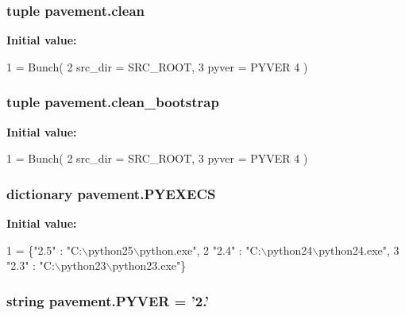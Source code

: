 \subsubsection[{clean}]{\setlength{\rightskip}{0pt plus 5cm}tuple pavement.\+clean}\label{namespacepavement_a522eb2426d7492ec5e58f9d33c57383b}
{\bfseries Initial value\+:}
\begin{DoxyCode}
1 = Bunch(
2         src\_dir = SRC\_ROOT,
3         pyver = PYVER
4     )
\end{DoxyCode}
\hypertarget{namespacepavement_a8e1619326965293da2fa40f456fae450}{}
\subsubsection[{clean\+\_\+bootstrap}]{\setlength{\rightskip}{0pt plus 5cm}tuple pavement.\+clean\+\_\+bootstrap}\label{namespacepavement_a8e1619326965293da2fa40f456fae450}
{\bfseries Initial value\+:}
\begin{DoxyCode}
1 = Bunch(
2         src\_dir = SRC\_ROOT,
3         pyver = PYVER
4     )
\end{DoxyCode}
\hypertarget{namespacepavement_a82d9e979fa2f57253e3bf6c59af5c791}{}
\subsubsection[{P\+Y\+E\+X\+E\+C\+S}]{\setlength{\rightskip}{0pt plus 5cm}dictionary pavement.\+P\+Y\+E\+X\+E\+C\+S}\label{namespacepavement_a82d9e979fa2f57253e3bf6c59af5c791}
{\bfseries Initial value\+:}
\begin{DoxyCode}
1 = \{\textcolor{stringliteral}{"2.5"} : \textcolor{stringliteral}{"C:\(\backslash\)python25\(\backslash\)python.exe"},
2         \textcolor{stringliteral}{"2.4"} : \textcolor{stringliteral}{"C:\(\backslash\)python24\(\backslash\)python24.exe"},
3         \textcolor{stringliteral}{"2.3"} : \textcolor{stringliteral}{"C:\(\backslash\)python23\(\backslash\)python23.exe"}\}
\end{DoxyCode}
\hypertarget{namespacepavement_ae43a0d03b5debefbb49ed19685cdb0db}{}
\subsubsection[{P\+Y\+V\+E\+R}]{\setlength{\rightskip}{0pt plus 5cm}string pavement.\+P\+Y\+V\+E\+R = '2.'}\label{namespacepavement_ae43a0d03b5debefbb49ed19685cdb0db}
\hypertarget{namespacepavement_aa956087044872a74ace6e2618c0ae2c6}{}

